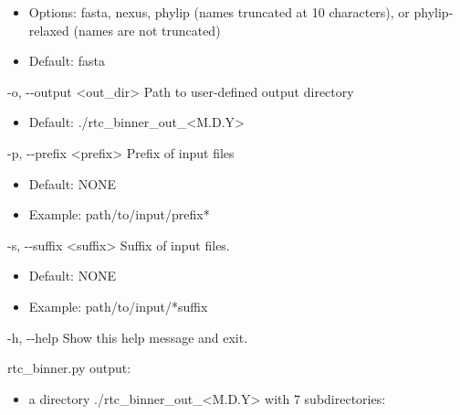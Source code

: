 \documentclass{article}
\begin{document}
\begin{description}
\begin{description}
\begin{description}
\begin{itemize}
                        \item Options: fasta, nexus, phylip (names truncated at 10 characters), or phylip-relaxed (names are not truncated)
                        \item Default: fasta
                    \end{itemize}
                    \item -o, -\/-output \hspace{0.2cm} <out\_dir> \hspace{0.2cm} Path to user-defined output directory
                    \begin{itemize}
                        \item Default: ./rtc\_binner\_out\_<M.D.Y>
                    \end{itemize}
                    \item -p, -\/-prefix \hspace{0.2cm} <prefix> \hspace{0.2cm} Prefix of input files
                    \begin{itemize}
                        \item Default: NONE
                        \item Example: path/to/input/prefix*
                    \end{itemize}
                    \item -s, -\/-suffix \hspace{0.2cm} <suffix> \hspace{0.2cm} Suffix of input files.
                    \begin{itemize}
                        \item Default: NONE
                        \item Example: path/to/input/*suffix
                    \end{itemize}
                    \item -h, -\/-help \hspace{0.2cm} Show this help message and exit.
                \end{description}
            \end{description}
            \vspace{0.2cm}
            \begin{description}
                \item rtc\_binner.py output:
                \begin{itemize}
                    \item a directory ./rtc\_binner\_out\_<M.D.Y> with 7 subdirectories:

\end{itemize}
\end{description}
\end{description}
\end{document}
